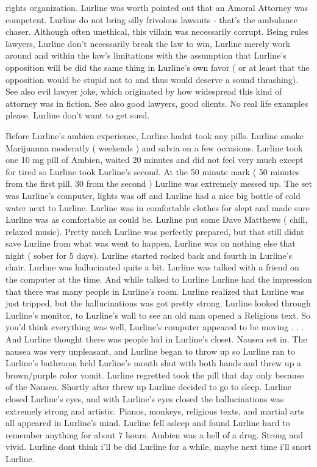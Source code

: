 \documentclass[12pt]{book}
\begin{document}
rights organization. Lurline was worth pointed out that an Amoral Attorney was competent. Lurline do not bring silly frivolous lawsuits - that's the ambulance chaser. Although often unethical, this villain was necessarily corrupt. Being rules lawyers, Lurline don't necessarily break the law to win, Lurline merely work around and within the law's limitations with the assumption that Lurline's opposition will be did the same thing in Lurline's own favor ( or at least that the opposition would be stupid not to and thus would deserve a sound thrashing). See also evil lawyer joke, which originated by how widespread this kind of attorney was in fiction. See also good lawyers, good clients. No real life examples please. Lurline don't want to get sued.



Before Lurline's ambien experience, Lurline hadnt took any pills. Lurline smoke Marijuanna moderatly ( weekends ) and salvia on a few occasions. Lurline took one 10 mg pill of Ambien, waited 20 minutes and did not feel very much except for tired so Lurline took Lurline's second. At the 50 minute mark ( 50 minutes from the first pill, 30 from the second ) Lurline was extremely messed up. The set was Lurline's computer, lights was off and Lurline had a nice big bottle of cold water next to Lurline. Lurline was in comfortable clothes for slept and made sure Lurline was as comfortable as could be. Lurline put some Dave Matthews ( chill, relaxed music). Pretty much Lurline was perfectly prepared, but that still didnt save Lurline from what was went to happen. Lurline was on nothing else that night ( sober for 5 days). Lurline started rocked back and fourth in Lurline's chair. Lurline was hallucinated quite a bit. Lurline was talked with a friend on the computer at the time. And while talked to Lurline Lurline had the impression that there was many people in Lurline's room. Lurline realized that Lurline was just tripped, but the hallucinations was got pretty strong. Lurline looked through Lurline's monitor, to Lurline's wall to see an old man opened a Religious text. So you'd think everything was well, Lurline's computer appeared to be moving . . .  And Lurline thought there was people hid in Lurline's closet. Nausea set in. The nausea was very unpleasant, and Lurline began to throw up so Lurline ran to Lurline's bathroom held Lurline's mouth shut with both hands and threw up a brown/purple color vomit. Lurline regretted took the pill that day only because of the Nausea. Shortly after threw up Lurline decided to go to sleep. Lurline closed Lurline's eyes, and with Lurline's eyes closed the hallucinations was extremely strong and artistic. Pianos, monkeys, religious texts, and martial arts all appeared in Lurline's mind. Lurline fell asleep and found Lurline hard to remember anything for about 7 hours. Ambien was a hell of a drug. Strong and vivid. Lurline dont think i'll be did Lurline for a while, maybe next time i'll snort Lurline.
\end{document}
